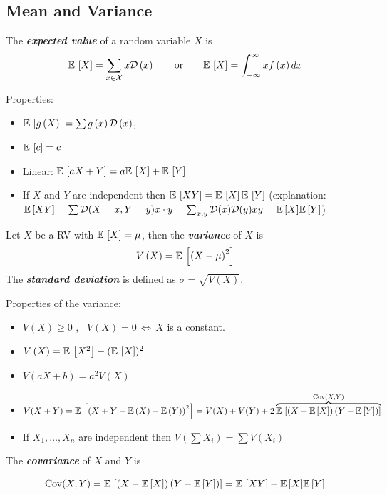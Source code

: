 \subsection{Mean and Variance}
\begin{definition}
The \textbf{\textit{expected value}} of a random variable
$X$ is
\[
\mathbb{E}\,\left[X\right]=\sum_{x\in\mathcal{X}}x\mathcal{D}\left(x\right)\qquad\mbox{or}\qquad \mathbb{E}\,\left[X\right]=\int_{-\infty}^{\infty}xf\left(x\right)dx
\]

\end{definition}
Properties:
\begin{itemize}
\item $\mathbb{E}\,\left[g\left(X\right)\right]=\sum g\left(x\right)\mathcal{D}\left(x\right)$,
\item $\mathbb{E}\,\left[c\right]=c$
\item Linear: $\mathbb{E}\,\left[aX+Y\right]=a\mathbb{E}\,\left[X\right]+\mathbb{E}\,\left[Y\right]$
\item If $X$ and $Y$ are independent then $\mathbb{E}\,\left[XY\right]=\mathbb{E}\,\left[X\right]\mathbb{E}\,\left[Y\right]$
(explanation: $\mathbb{E}\,[XY]=\sum\mathcal{D}(X=x,Y=y)x\cdot y = \sum_{x,y}\mathcal{D}(x)\mathcal{D}(y)xy=\mathbb{E}\,[X]\mathbb{E}\,[Y]$)
\end{itemize}

\begin{definition}
Let $X$ be a RV with $\mathbb{E}\,\left[X\right]=\mu$, then the \textbf{\textit{variance}}
of $X$ is
\[
V\left(X\right)=\mathbb{E}\,\left[\left(X-\mu\right)^{2}\right]
\]
The \textbf{\textit{standard deviation}} is defined as $\sigma=\sqrt{V\left(X\right)}$.
\end{definition}
Properties of the variance:
\begin{itemize}
\item $V(X)\geq0$ , ~$V(X)=0\,\iff\,X$ is a constant.
\item $V\left(X\right)=\mathbb{E}\,\left[X^{2}\right] - (\mathbb{E}\,\left[X\right])^{2}$
\item $V(aX+b)=a^{2}V(X)$
\item $V(X+Y)=\mathbb{E}\,\left[\left(X+Y-\mathbb{E}\,(X)-\mathbb{E}\,(Y)\right)^{2}\right]=V(X)+V(Y)+2\overbrace{\mathbb{E}\,\left[\left(X-\mathbb{E}\,[X]\right)\left(Y-\mathbb{E}\,[Y]\right)\right]}^{\mathrm{Cov}\left(X,Y\right)}$
\item If $X_{1},\dots,X_{n}$ are independent then $V\left(\sum X_{i}\right)=\sum V\left(X_{i}\right)$\end{itemize}

\begin{definition}
The \textbf{\textit{covariance}} of $X$ and $Y$ is
\end{definition}
\[
\mathrm{Cov}(X,Y)=\mathbb{E}\,\left[\left(X-\mathbb{E}\,[X]\right)\left(Y-\mathbb{E}\,[Y]\right)\right]=\mathbb{E}\,\left[XY\right]-\mathbb{E}\,[X]\mathbb{E}\,[Y]
\]

